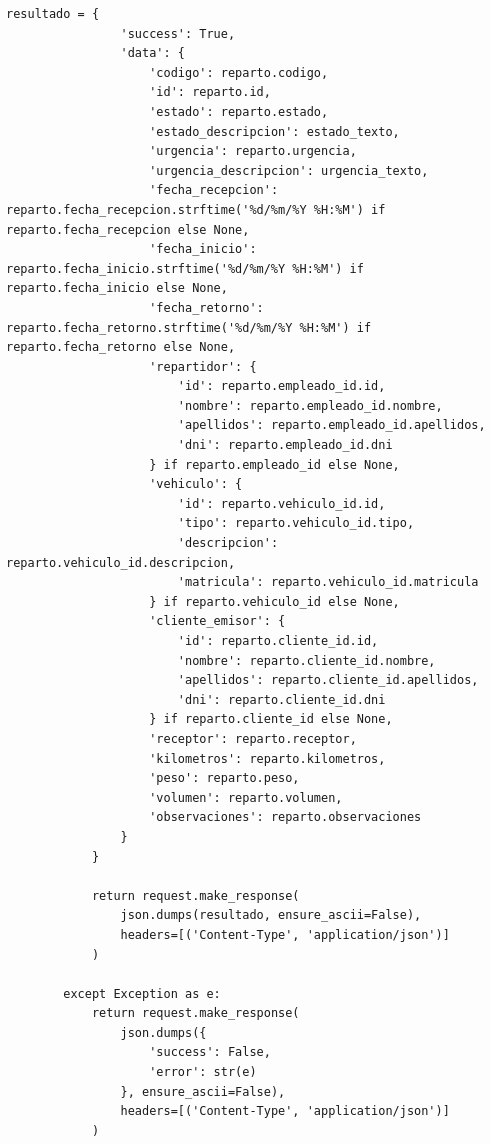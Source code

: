 \documentclass[a4paper, 11pt]{article}
\begin{document}
\begin{lstlisting}[frame=single,breaklines=true]
            resultado = {
                'success': True,
                'data': {
                    'codigo': reparto.codigo,
                    'id': reparto.id,
                    'estado': reparto.estado,
                    'estado_descripcion': estado_texto,
                    'urgencia': reparto.urgencia,
                    'urgencia_descripcion': urgencia_texto,
                    'fecha_recepcion': reparto.fecha_recepcion.strftime('%d/%m/%Y %H:%M') if reparto.fecha_recepcion else None,
                    'fecha_inicio': reparto.fecha_inicio.strftime('%d/%m/%Y %H:%M') if reparto.fecha_inicio else None,
                    'fecha_retorno': reparto.fecha_retorno.strftime('%d/%m/%Y %H:%M') if reparto.fecha_retorno else None,
                    'repartidor': {
                        'id': reparto.empleado_id.id,
                        'nombre': reparto.empleado_id.nombre,
                        'apellidos': reparto.empleado_id.apellidos,
                        'dni': reparto.empleado_id.dni
                    } if reparto.empleado_id else None,
                    'vehiculo': {
                        'id': reparto.vehiculo_id.id,
                        'tipo': reparto.vehiculo_id.tipo,
                        'descripcion': reparto.vehiculo_id.descripcion,
                        'matricula': reparto.vehiculo_id.matricula
                    } if reparto.vehiculo_id else None,
                    'cliente_emisor': {
                        'id': reparto.cliente_id.id,
                        'nombre': reparto.cliente_id.nombre,
                        'apellidos': reparto.cliente_id.apellidos,
                        'dni': reparto.cliente_id.dni
                    } if reparto.cliente_id else None,
                    'receptor': reparto.receptor,
                    'kilometros': reparto.kilometros,
                    'peso': reparto.peso,
                    'volumen': reparto.volumen,
                    'observaciones': reparto.observaciones
                }
            }
            
            return request.make_response(
                json.dumps(resultado, ensure_ascii=False),
                headers=[('Content-Type', 'application/json')]
            )
            
        except Exception as e:
            return request.make_response(
                json.dumps({
                    'success': False,
                    'error': str(e)
                }, ensure_ascii=False),
                headers=[('Content-Type', 'application/json')]
            )


\end{lstlisting}
\end{document}
